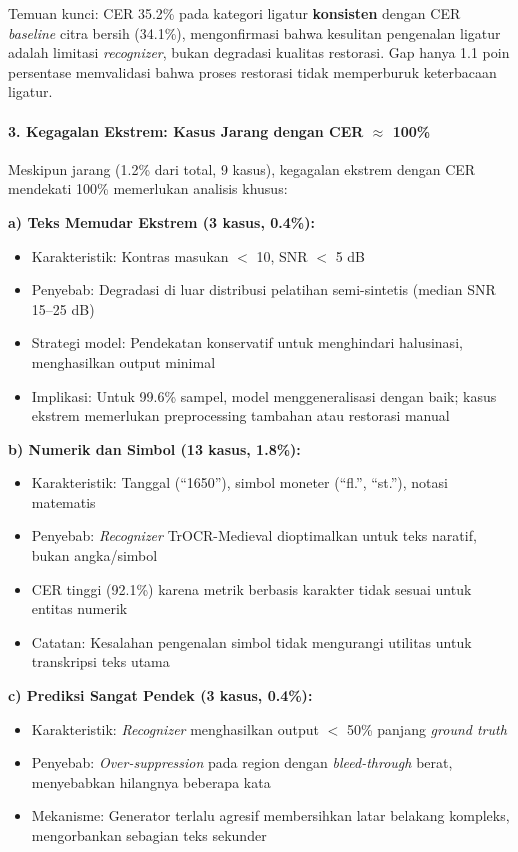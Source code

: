\documentclass[12pt,a4paper]{article}
\begin{document}
Temuan kunci: CER 35.2\% pada kategori ligatur \textbf{konsisten} dengan CER \textit{baseline} citra bersih (34.1\%), mengonfirmasi bahwa kesulitan pengenalan ligatur adalah limitasi \textit{recognizer}, bukan degradasi kualitas restorasi. Gap hanya 1.1 poin persentase memvalidasi bahwa proses restorasi tidak memperburuk keterbacaan ligatur.

\paragraph{3. Kegagalan Ekstrem: Kasus Jarang dengan CER $\approx$ 100\%}

Meskipun jarang (1.2\% dari total, 9 kasus), kegagalan ekstrem dengan CER mendekati 100\% memerlukan analisis khusus:

\textbf{a) Teks Memudar Ekstrem (3 kasus, 0.4\%):}
\begin{itemize}[nosep]
    \item Karakteristik: Kontras masukan $<$ 10, SNR $<$ 5 dB
    \item Penyebab: Degradasi di luar distribusi pelatihan semi-sintetis (median SNR 15--25 dB)
    \item Strategi model: Pendekatan konservatif untuk menghindari halusinasi, menghasilkan output minimal
    \item Implikasi: Untuk 99.6\% sampel, model menggeneralisasi dengan baik; kasus ekstrem memerlukan preprocessing tambahan atau restorasi manual
\end{itemize}

\textbf{b) Numerik dan Simbol (13 kasus, 1.8\%):}
\begin{itemize}[nosep]
    \item Karakteristik: Tanggal (``1650''), simbol moneter (``fl.'', ``st.''), notasi matematis
    \item Penyebab: \textit{Recognizer} TrOCR-Medieval dioptimalkan untuk teks naratif, bukan angka/simbol
    \item CER tinggi (92.1\%) karena metrik berbasis karakter tidak sesuai untuk entitas numerik
    \item Catatan: Kesalahan pengenalan simbol tidak mengurangi utilitas untuk transkripsi teks utama
\end{itemize}

\textbf{c) Prediksi Sangat Pendek (3 kasus, 0.4\%):}
\begin{itemize}[nosep]
    \item Karakteristik: \textit{Recognizer} menghasilkan output $<$ 50\% panjang \textit{ground truth}
    \item Penyebab: \textit{Over-suppression} pada region dengan \textit{bleed-through} berat, menyebabkan hilangnya beberapa kata
    \item Mekanisme: Generator terlalu agresif membersihkan latar belakang kompleks, mengorbankan sebagian teks sekunder
\end{itemize}
\end{document}
